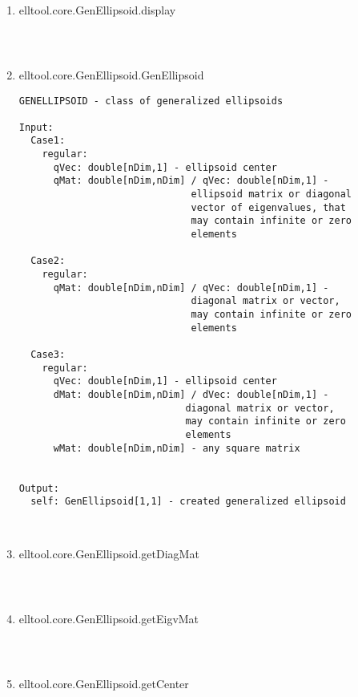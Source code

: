\begin{enumerate}
\begin{lstlisting}
\end{lstlisting}
\fontfamily{\familydefault}
\selectfont
\item {elltool.core.GenEllipsoid.display}
\selectfont
\begin{lstlisting}



\end{lstlisting}
\fontfamily{\familydefault}
\selectfont
\item {elltool.core.GenEllipsoid.GenEllipsoid}
\selectfont
\begin{lstlisting}
GENELLIPSOID - class of generalized ellipsoids

Input:
  Case1:
    regular:
      qVec: double[nDim,1] - ellipsoid center
      qMat: double[nDim,nDim] / qVec: double[nDim,1] -
                              ellipsoid matrix or diagonal
                              vector of eigenvalues, that
                              may contain infinite or zero
                              elements

  Case2:
    regular:
      qMat: double[nDim,nDim] / qVec: double[nDim,1] -
                              diagonal matrix or vector,
                              may contain infinite or zero
                              elements

  Case3:
    regular:
      qVec: double[nDim,1] - ellipsoid center
      dMat: double[nDim,nDim] / dVec: double[nDim,1] -
                             diagonal matrix or vector,
                             may contain infinite or zero
                             elements
      wMat: double[nDim,nDim] - any square matrix


Output:
  self: GenEllipsoid[1,1] - created generalized ellipsoid



\end{lstlisting}
\fontfamily{\familydefault}
\selectfont
\item {elltool.core.GenEllipsoid.getDiagMat}
\selectfont
\begin{lstlisting}



\end{lstlisting}
\fontfamily{\familydefault}
\selectfont
\item {elltool.core.GenEllipsoid.getEigvMat}
\selectfont
\begin{lstlisting}



\end{lstlisting}
\fontfamily{\familydefault}
\selectfont
\item {elltool.core.GenEllipsoid.getCenter}
\selectfont
\begin{lstlisting}




\end{lstlisting}
\end{enumerate}
